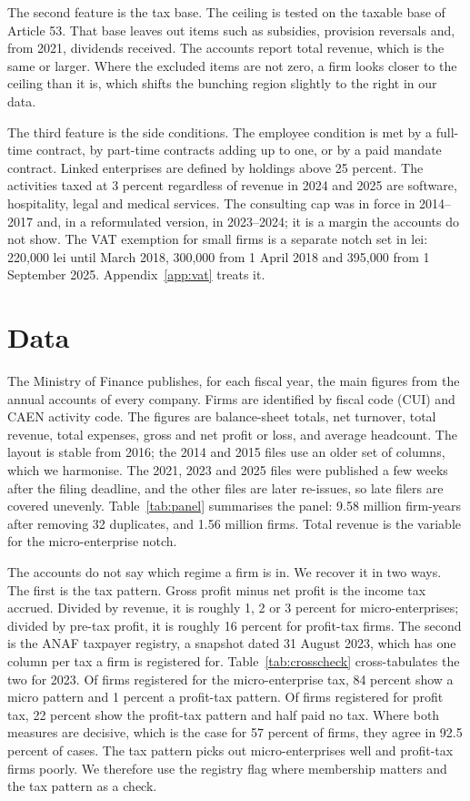 \documentclass[12pt]{article}
\begin{document}
The second feature is the tax base. The ceiling is tested on the taxable base of Article 53. That base leaves out items such as subsidies, provision reversals and, from 2021, dividends received. The accounts report total revenue, which is the same or larger. Where the excluded items are not zero, a firm looks closer to the ceiling than it is, which shifts the bunching region slightly to the right in our data.

The third feature is the side conditions. The employee condition is met by a full-time contract, by part-time contracts adding up to one, or by a paid mandate contract. Linked enterprises are defined by holdings above 25 percent. The activities taxed at 3 percent regardless of revenue in 2024 and 2025 are software, hospitality, legal and medical services. The consulting cap was in force in 2014--2017 and, in a reformulated version, in 2023--2024; it is a margin the accounts do not show. The VAT exemption for small firms is a separate notch set in lei: 220,000 lei until March 2018, 300,000 from 1 April 2018 and 395,000 from 1 September 2025. Appendix~\ref{app:vat} treats it.

\FloatBarrier
\section{Data}\label{sec:data}

The Ministry of Finance publishes, for each fiscal year, the main figures from the annual accounts of every company. Firms are identified by fiscal code (CUI) and CAEN activity code. The figures are balance-sheet totals, net turnover, total revenue, total expenses, gross and net profit or loss, and average headcount. The layout is stable from 2016; the 2014 and 2015 files use an older set of columns, which we harmonise. The 2021, 2023 and 2025 files were published a few weeks after the filing deadline, and the other files are later re-issues, so late filers are covered unevenly. Table~\ref{tab:panel} summarises the panel: 9.58 million firm-years after removing 32 duplicates, and 1.56 million firms. Total revenue is the variable for the micro-enterprise notch.



The accounts do not say which regime a firm is in. We recover it in two ways. The first is the tax pattern. Gross profit minus net profit is the income tax accrued. Divided by revenue, it is roughly 1, 2 or 3 percent for micro-enterprises; divided by pre-tax profit, it is roughly 16 percent for profit-tax firms. The second is the ANAF taxpayer registry, a snapshot dated 31 August 2023, which has one column per tax a firm is registered for. Table~\ref{tab:crosscheck} cross-tabulates the two for 2023. Of firms registered for the micro-enterprise tax, 84 percent show a micro pattern and 1 percent a profit-tax pattern. Of firms registered for profit tax, 22 percent show the profit-tax pattern and half paid no tax. Where both measures are decisive, which is the case for 57 percent of firms, they agree in 92.5 percent of cases. The tax pattern picks out micro-enterprises well and profit-tax firms poorly. We therefore use the registry flag where membership matters and the tax pattern as a check.
\end{document}
